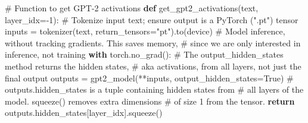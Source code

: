 \documentclass[
  letterpaper,
  DIV=11,
  numbers=noendperiod]{scrreprt}
\newenvironment{Shaded}{\begin{snugshade}}{\end{snugshade}}
\newcommand{\CommentTok}[1]{\textcolor[rgb]{0.37,0.37,0.37}{#1}}
\newcommand{\ControlFlowTok}[1]{\textcolor[rgb]{0.00,0.23,0.31}{\textbf{#1}}}
\newcommand{\DecValTok}[1]{\textcolor[rgb]{0.68,0.00,0.00}{#1}}
\newcommand{\KeywordTok}[1]{\textcolor[rgb]{0.00,0.23,0.31}{\textbf{#1}}}
\newcommand{\NormalTok}[1]{\textcolor[rgb]{0.00,0.23,0.31}{#1}}
\newcommand{\OperatorTok}[1]{\textcolor[rgb]{0.37,0.37,0.37}{#1}}
\newcommand{\StringTok}[1]{\textcolor[rgb]{0.13,0.47,0.30}{#1}}
\newcommand{\VariableTok}[1]{\textcolor[rgb]{0.07,0.07,0.07}{#1}}
\begin{document}
\begin{Shaded}
\begin{Highlighting}[]
\CommentTok{\# Function to get GPT{-}2 activations}
\KeywordTok{def}\NormalTok{ get\_gpt2\_activations(text, layer\_idx}\OperatorTok{={-}}\DecValTok{1}\NormalTok{):}
    \CommentTok{\# Tokenize input text; ensure output is a PyTorch (".pt") tensor}
\NormalTok{    inputs }\OperatorTok{=}\NormalTok{ tokenizer(text, return\_tensors}\OperatorTok{=}\StringTok{"pt"}\NormalTok{).to(device)}
    \CommentTok{\# Model inference, without tracking gradients. This saves memory,}
    \CommentTok{\# since we are only interested in inference, not training}
    \ControlFlowTok{with}\NormalTok{ torch.no\_grad():}
        \CommentTok{\# The output\_hidden\_states method returns the hidden states,}
        \CommentTok{\# aka activations, from all layers, not just the final output}
\NormalTok{        outputs }\OperatorTok{=}\NormalTok{ gpt2\_model(}\OperatorTok{**}\NormalTok{inputs, output\_hidden\_states}\OperatorTok{=}\VariableTok{True}\NormalTok{)}
    \CommentTok{\# outputs.hidden\_states is a tuple containing hidden states from}
    \CommentTok{\# all layers of the model. squeeze() removes extra dimensions}
    \CommentTok{\# of size 1 from the tensor.}
    \ControlFlowTok{return}\NormalTok{ outputs.hidden\_states[layer\_idx].squeeze()}
\end{Highlighting}
\end{Shaded}
\end{document}
